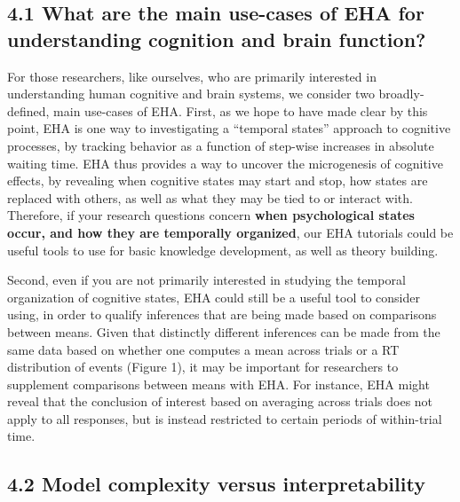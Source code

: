 \documentclass[
  man, donotrepeattitle,floatsintext]{apa6}
\begin{document}
\subsection{4.1 What are the main use-cases of EHA for understanding cognition and brain function?}\label{what-are-the-main-use-cases-of-eha-for-understanding-cognition-and-brain-function}

For those researchers, like ourselves, who are primarily interested in understanding human cognitive and brain systems, we consider two broadly-defined, main use-cases of EHA. First, as we hope to have made clear by this point, EHA is one way to investigating a ``temporal states'' approach to cognitive processes, by tracking behavior as a function of step-wise increases in absolute waiting time. EHA thus provides a way to uncover the microgenesis of cognitive effects, by revealing when cognitive states may start and stop, how states are replaced with others, as well as what they may be tied to or interact with. Therefore, if your research questions concern \textbf{when psychological states occur, and how they are temporally organized}, our EHA tutorials could be useful tools to use for basic knowledge development, as well as theory building.

Second, even if you are not primarily interested in studying the temporal organization of cognitive states, EHA could still be a useful tool to consider using, in order to qualify inferences that are being made based on comparisons between means. Given that distinctly different inferences can be made from the same data based on whether one computes a mean across trials or a RT distribution of events (Figure 1), it may be important for researchers to supplement comparisons between means with EHA. For instance, EHA might reveal that the conclusion of interest based on averaging across trials does not apply to all responses, but is instead restricted to certain periods of within-trial time.

\subsection{4.2 Model complexity versus interpretability}\label{model-complexity-versus-interpretability}
\end{document}
